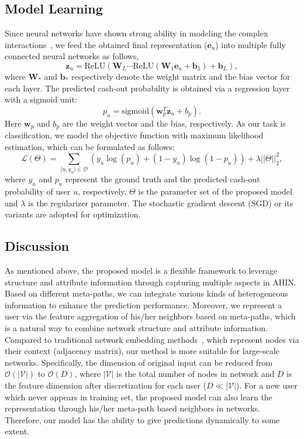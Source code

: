 \subsection{Model Learning}
Since neural networks have shown strong ability in modeling the complex interactions~\citep{he2017neural}, we feed the obtained final representation (\ie $\mathbf{e}_u$) into multiple fully connected neural networks as follows,
\begin{equation}
\mathbf{z}_u = \text{ReLU}(\textbf{W}_{L} \cdots \text{ReLU}(\mathbf{W}_1\mathbf{e}_u + \mathbf{b}_1) + \mathbf{b}_{L}),
\end{equation}
where $\mathbf{W}_*$ and $\mathbf{b}_*$ respectively denote the weight matrix and the bias vector for each layer. The predicted cash-out probability is obtained via a regression layer with a sigmoid unit:
\begin{equation}
p_u = \text{sigmoid}(\mathbf{w}_p^{T}\mathbf{z}_u + b_p).
\end{equation}
Here $\mathbf{w}_p$ and $b_p$ are the weight vector and the bias, respectively. As our task is classification, we model the objective function with maximum likelihood estimation, which can be formulated as follows:
\begin{equation}
\label{equ-objective}
\mathcal{L}(\Theta) = \sum_{\langle u, y_u \rangle \in \mathcal{D}}(y_u\log(p_u) + (1 - y_u)\log(1 - p_u)) + \lambda ||\Theta||^2_2, 
\end{equation}
where $y_u$ and $p_u$ represent the ground truth and the predicted cash-out probability of user $u$, respectively. $\Theta$ is the parameter set of the proposed model and $\lambda$ is the regularizer parameter. The stochastic gradient descent (SGD) or its variants are adopted for optimization.

\subsection{Discussion}
As mentioned above, the proposed model is a flexible framework to leverage structure and attribute information through capturing multiple aspects in AHIN. Based on different meta-paths, we can integrate various kinds of heterogeneous information to enhance the prediction performance. Moreover, we represent a user via the feature aggregation of his/her neighbors based on meta-paths, which is a natural way to combine network structure and attribute information. Compared to traditional network embedding methods~\citep{wang2016structural,dai2016discriminative}, which represent nodes via their context (\eg adjacency matrix), our method is more suitable for large-scale networks. Specifically, the dimension of original input can be reduced from $\mathcal{O}(|\mathcal{V}|)$ to $\mathcal{O}(D)$, where $|\mathcal{V}|$ is the total number of nodes in network and $D$ is the feature dimension after  discretization for each user ($D \ll |\mathcal{V}|$). For a new user which never appears in training set, the proposed model can also learn the representation through his/her meta-path based neighbors in networks. Therefore, our model has the ability to give predictions dynamically to some extent.
